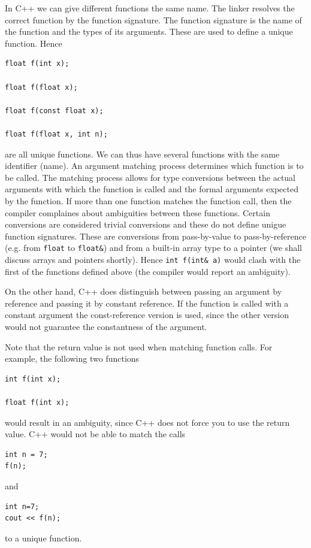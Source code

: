 In C++ we can give different functions the same name. The linker resolves the correct
function by the function signature. The function signature is the name of the function
and the types of its arguments. These are used to define a unique function. Hence
{\small \begin{verbatim}
float f(int x);

float f(float x);

float f(const float x);

float f(float x, int n);
\end{verbatim}}
\noindent
are all unique functions. We can thus have several functions with the same identifier
(name). An argument matching process determines which function is to be called. The
matching process allows for type conversions between the actual arguments with which
the function is called and the formal arguments expected by the function. If more than
one function matches the function call, then the compiler complaines about ambiguities
between these functions. Certain conversions are considered trivial conversions and
these do not define unigue function signatures. These are conversions from pass-by-value
to pass-by-reference (e.g. from \verb+float+ to \verb+float&+) and from a built-in array type
to a pointer (we shall discuss arrays and pointers shortly). Hence \verb+int f(int& a)+
would clash with the first of the functions defined above (the compiler would report an
ambiguity).

On the other hand, C++ does distinguish between passing an argument by reference and
passing it by constant reference. If the function is called with a constant argument the
const-reference version is used, since the other version would not guarantee the
constantness of the argument.

Note that the return value is not used when matching function calls. For example, the
following two functions
{\small \begin{verbatim}
int f(int x);

float f(int x);
\end{verbatim}}
\noindent
would result in an ambiguity, since C++ does not force you to use the return value. C++
would not be able to match the calls
{\small \begin{verbatim}
int n = 7;
f(n);
\end{verbatim}}
\noindent
and
{\small \begin{verbatim}
int n=7;
cout << f(n);
\end{verbatim}}
\noindent
to a unique function.

